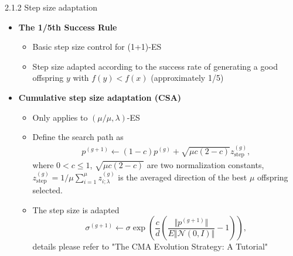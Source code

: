 \documentclass{beamer}
\begin{document}
\begin{frame}{2.1.2 Step size adaptation}
\begin{itemize}
    \item \textbf{The 1/5th Success Rule} 
    \begin{itemize}
        \item Basic step size control for (1+1)-ES 
        \item Step size adapted according to the success rate  of generating a good offspring $y$ with $f(y)<f(x)$ (approximately 1/5)
    \end{itemize}

    \item \textbf{Cumulative step size adaptation (CSA)}
    \begin{itemize}
        \item Only applies to $(\mu/\mu,\lambda)$-ES
        \item Define the search path as 
        \begin{align}
        p^{(g+1)} \leftarrow (1-c)p^{(g)} + \sqrt{\mu c (2-c)} z_{\text{step}}^{(g)},\nonumber 
        \end{align}
        where $0<c \leq 1$, $ \sqrt{\mu c (2-c)}$ are two normalization constants, $z_{\text{step}}^{(g)} = 
        1/\mu \sum_{i=1}^\mu z_{i;\lambda}^{(g)}$ is the averaged direction of the best $\mu$ offspring selected.
        \item The step size is adapted 
            $$\sigma^{(g+1)} \leftarrow \sigma \exp \left (  \frac{c}{d}  \left( \frac{\Vert p^{(g+1)}\Vert}{E \Vert \mathcal{N}(0,I)\Vert } -1 \right) \right ),$$
            details please refer to "The CMA Evolution Strategy: A Tutorial" 
    \end{itemize}

\end{itemize}
\end{frame}
\end{document}
